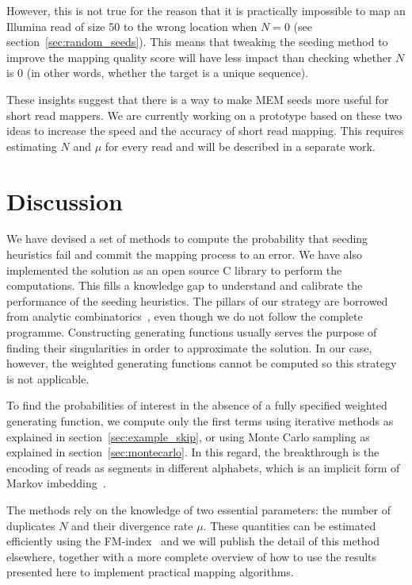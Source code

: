 \documentclass{article}
\begin{document}
However, this is not true for the reason that it is practically impossible
to map an Illumina read of size 50 to the wrong location when $N=0$ (see
section~\ref{sec:random_seeds}). This means that tweaking the seeding
method to improve the mapping quality score will have less impact than
checking whether $N$ is 0 (in other words, whether the target is a unique
sequence).

These insights suggest that there is a way to make MEM seeds more useful
for short read mappers. We are currently working on a prototype based on
these two ideas to increase the speed and the accuracy of short read
mapping. This requires estimating $N$ and $\mu$ for every read and will be
described in a separate work.


\section{Discussion}

We have devised a set of methods to compute the probability that seeding
heuristics fail and commit the mapping process to an error. We have also
implemented the solution as an open source C library to perform the
computations. This fills a knowledge gap to understand and calibrate the
performance of the seeding heuristics. The pillars of our strategy are
borrowed from analytic combinatorics~\cite{flajolet2009analytic,
sedgewick2013introduction}, even though we do not follow the complete
programme. Constructing generating functions usually serves the purpose of
finding their singularities in order to approximate the solution. In our
case, however, the weighted generating functions cannot be computed so
this strategy is not applicable.

To find the probabilities of interest in the absence of a fully specified
weighted generating function, we compute only the first terms using
iterative methods as explained in section~\ref{sec:example_skip}, or using
Monte Carlo sampling as explained in section~\ref{sec:montecarlo}. In this
regard, the breakthrough is the encoding of reads as segments in different
alphabets, which is an implicit form of Markov
imbedding~\cite{fu1994distribution}.

The methods rely on the knowledge of two essential parameters: the number
of duplicates $N$ and their divergence rate $\mu$. These quantities can be
estimated efficiently using the FM-index~\cite{ferragina2005indexing} and
we will publish the detail of this method elsewhere, together with a more
complete overview of how to use the results presented here to implement
practical mapping algorithms.
\end{document}
